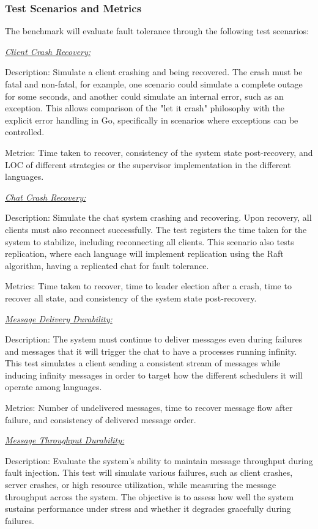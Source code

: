 \subsubsection{Test Scenarios and Metrics}

The benchmark will evaluate fault tolerance through the following test scenarios:

\textit{\underline{Client Crash Recovery:}}

Description: Simulate a client crashing and being recovered. The crash must be fatal and non-fatal, for example, one scenario could simulate a complete outage for some seconds, and another could simulate an internal error, such as an exception. This allows comparison of the "let it crash" philosophy with the explicit error handling in Go, specifically in scenarios where exceptions can be controlled.

Metrics: Time taken to recover, consistency of the system state post-recovery, and \gls{LOC} of different strategies or the supervisor implementation in the different languages.

\textit{\underline{Chat Crash Recovery:}}

Description: Simulate the chat system crashing and recovering. Upon recovery, all clients must also reconnect successfully. The test registers the time taken for the system to stabilize, including reconnecting all clients. This scenario also tests replication, where each language will implement replication using the Raft algorithm, having a replicated chat for fault tolerance.

Metrics: Time taken to recover, time to leader election after a crash, time to recover all state, and consistency of the system state post-recovery.

\textit{\underline{Message Delivery Durability:}}

Description: The system must continue to deliver messages even during failures and messages that it will trigger the chat to have a processes running infinity. This test simulates a client sending a consistent stream of messages while inducing infinity messages in order to target how the different schedulers it will operate among languages.

Metrics: Number of undelivered messages, time to recover message flow after failure, and consistency of delivered message order.

\textit{\underline{Message Throughput Durability:}}

Description: Evaluate the system's ability to maintain message throughput during fault injection. This test will simulate various failures, such as client crashes, server crashes, or high resource utilization, while measuring the message throughput across the system. The objective is to assess how well the system sustains performance under stress and whether it degrades gracefully during failures.

